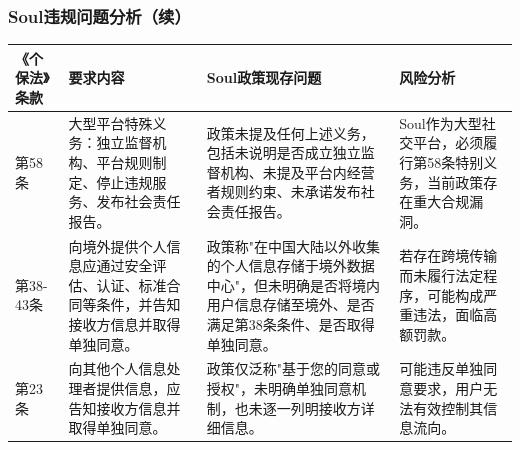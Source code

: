 \documentclass[AutoFakeBold,AutoFakeSlant]{beamer}
\begin{document}
\begin{frame}
	\frametitle{Soul违规问题分析（续）}
	\tiny
	\begin{tabularx}{\textwidth}{|p{1.2cm}|p{2.2cm}|p{3cm}|p{3cm}|}
		\toprule
		\textbf{《个保法》条款} & \textbf{要求内容} & \textbf{Soul政策现存问题} & \textbf{风险分析} \\
		\midrule
		第58条 & 大型平台特殊义务：独立监督机构、平台规则制定、停止违规服务、发布社会责任报告。 & 政策未提及任何上述义务，包括未说明是否成立独立监督机构、未提及平台内经营者规则约束、未承诺发布社会责任报告。 & Soul作为大型社交平台，必须履行第58条特别义务，当前政策存在重大合规漏洞。 \\
		\midrule
		第38-43条 & 向境外提供个人信息应通过安全评估、认证、标准合同等条件，并告知接收方信息并取得单独同意。 & 政策称"在中国大陆以外收集的个人信息存储于境外数据中心"，但未明确是否将境内用户信息存储至境外、是否满足第38条条件、是否取得单独同意。 & 若存在跨境传输而未履行法定程序，可能构成严重违法，面临高额罚款。 \\
		\midrule
		第23条 & 向其他个人信息处理者提供信息，应告知接收方信息并取得单独同意。 & 政策仅泛称"基于您的同意或授权"，未明确单独同意机制，也未逐一列明接收方详细信息。 & 可能违反单独同意要求，用户无法有效控制其信息流向。 \\
		\bottomrule
	\end{tabularx}
\end{frame}
\end{document}
